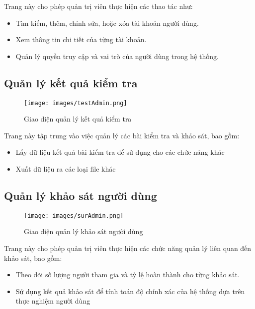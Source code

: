 Trang này cho phép quản trị viên thực hiện các thao tác như:
\begin{itemize}
    \item Tìm kiếm, thêm, chỉnh sửa, hoặc xóa tài khoản người dùng.
    \item Xem thông tin chi tiết của từng tài khoản.
    \item Quản lý quyền truy cập và vai trò của người dùng trong hệ thống.
\end{itemize}

\subsection{Quản lý kết quả kiểm tra}
\label{sec:test_management}
\begin{figure}[H]
    \centering
    \texttt{[image: images/testAdmin.png]}
    \vspace{0.6cm}
    \caption{Giao diện quản lý kết quả kiểm tra}
\end{figure}

Trang này tập trung vào việc quản lý các bài kiểm tra và khảo sát, bao gồm:
\begin{itemize}
    \item Lấy dữ liệu kết quả bài kiểm tra để sử dụng cho các chức năng khác 
    \item Xuất dữ liệu ra các loại file khác
\end{itemize}

\subsection{Quản lý khảo sát người dùng}
\label{sec:survey_management}
\begin{figure}[H]
    \centering
    \texttt{[image: images/surAdmin.png]}
    \vspace{0.6cm}
    \caption{Giao diện quản lý khảo sát người dùng}
\end{figure}

Trang này cho phép quản trị viên thực hiện các chức năng quản lý liên quan đến khảo sát, bao gồm:
\begin{itemize}
    \item Theo dõi số lượng người tham gia và tỷ lệ hoàn thành cho từng khảo sát.
    \item Sử dụng kết quả khảo sát để tính toán độ chính xác của hệ thống dựa trên thực nghiệm người dùng
\end{itemize}

